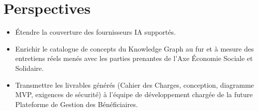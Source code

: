 \section{Perspectives}
\begin{itemize}
    \item Étendre la couverture des fournisseurs IA supportés.
    \item Enrichir le catalogue de concepts du Knowledge Graph au fur et à mesure des
    entretiens réels menés avec les parties prenantes de l'Axe Économie Sociale et
    Solidaire.
    \item Transmettre les livrables générés (Cahier des Charges, conception, diagramme
    MVP, exigences de sécurité) à l'équipe de développement chargée de la future
    Plateforme de Gestion des Bénéficiaires.
\end{itemize}
